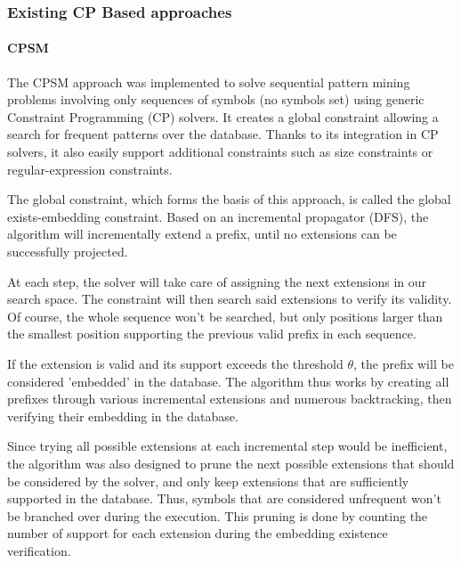 \documentclass{eplmastersthesis}
\begin{document}
\subsubsection{Existing CP Based approaches}
\paragraph{CPSM}

The CPSM approach \cite{negrevergne2015constraint} was implemented to solve sequential pattern mining problems involving only sequences of symbols (no symbols set) using generic Constraint Programming (CP) solvers. It creates a global constraint allowing a search for frequent patterns over the database. Thanks to its integration in CP solvers, it also easily support additional constraints such as size constraints or regular-expression constraints. \newline

The global constraint, which forms the basis of this approach, is called the global exists-embedding constraint. Based on an incremental propagator (DFS), the algorithm will incrementally extend a prefix, until no extensions can be successfully projected. \newline

At each step, the solver will take care of assigning the next extensions in our search space. The constraint will then search said extensions to verify its validity. Of course, the whole sequence won't be searched, but only positions larger than the smallest position supporting the previous valid prefix in each sequence. \newline

If the extension is valid and its support exceeds the threshold $\theta$, the prefix will be considered 'embedded' in the database. The algorithm thus works by creating all prefixes through various incremental extensions and numerous backtracking, then verifying their embedding in the database. \newline

Since trying all possible extensions at each incremental step would be inefficient, the algorithm was also designed to prune the next possible extensions that should be considered by the solver, and only keep extensions that are sufficiently supported in the database. Thus, symbols that are considered unfrequent won't be branched over during the execution. This pruning is done by counting the number of support for each extension during the embedding existence verification. \newline
\end{document}
